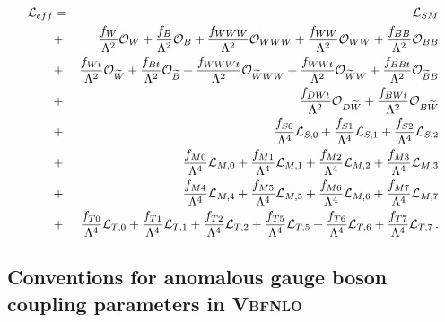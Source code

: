 \documentclass[english,12pt]{article}
\begin{document}
\vbox{
\begin{eqnarray}
 {\cal L}_{eff} &=& {\cal L}_{SM} \nonumber\\
        &+& \frac{f_{W}}{\Lambda^{2}} \mathcal{O}_{W} + \frac{f_{B}}{\Lambda^{2}} \mathcal{O}_{B}  
	+ \frac{f_{WWW}}{\Lambda^{2}} \mathcal{O}_{WWW} + \frac{f_{WW}}{\Lambda^{2}} \mathcal{O}_{WW} 
        + \frac{f_{BB}}{\Lambda^{2}} \mathcal{O}_{BB} \nonumber\\
        &+& \frac{f_{Wt}}{\Lambda^{2}} \mathcal{O}_{\widetilde{W}} + \frac{f_{Bt}}{\Lambda^{2}} \mathcal{O}_{\widetilde{B}} 
	+ \frac{f_{WWWt}}{\Lambda^{2}} \mathcal{O}_{\widetilde{W}WW} 
        + \frac{f_{WWt}}{\Lambda^{2}} \mathcal{O}_{\widetilde{W}W} + \frac{f_{BBt}}{\Lambda^{2}} \mathcal{O}_{\widetilde{B}B} \nonumber\\
        &+& \frac{f_{DWt}}{\Lambda^{2}} \mathcal{O}_{D\widetilde{W}} + \frac{f_{BWt}}{\Lambda^{2}} \mathcal{O}_{B\widetilde{W}} \nonumber\\
	&+& \frac{f_{S0}}{\Lambda^4} {\cal L}_{S,0} + \frac{f_{S1}}{\Lambda^4} {\cal L}_{S,1} + \frac{f_{S2}}{\Lambda^4} {\cal L}_{S,2} \nonumber\\
	&+& \frac{f_{M0}}{\Lambda^4} {\cal L}_{M,0} + \frac{f_{M1}}{\Lambda^4} {\cal L}_{M,1}
	+ \frac{f_{M2}}{\Lambda^4} {\cal L}_{M,2} + \frac{f_{M3}}{\Lambda^4} {\cal L}_{M,3} \nonumber\\
	&+& \frac{f_{M4}}{\Lambda^4} {\cal L}_{M,4} + \frac{f_{M5}}{\Lambda^4} {\cal L}_{M,5}
	+ \frac{f_{M6}}{\Lambda^4} {\cal L}_{M,6} + \frac{f_{M7}}{\Lambda^4} {\cal L}_{M,7} \nonumber\\
	&+& \frac{f_{T0}}{\Lambda^4} {\cal L}_{T,0} + \frac{f_{T1}}{\Lambda^4} {\cal L}_{T,1}
	+ \frac{f_{T2}}{\Lambda^4} {\cal L}_{T,2} + \frac{f_{T5}}{\Lambda^4} {\cal L}_{T,5}
	+ \frac{f_{T6}}{\Lambda^4} {\cal L}_{T,6} + \frac{f_{T7}}{\Lambda^4} {\cal L}_{T,7} \, .
\label{leff}
\end{eqnarray}
}


\subsection{Conventions for anomalous gauge boson coupling parameters in \textsc{Vbfnlo}}
\label{ancpl_conversion}
\end{document}
